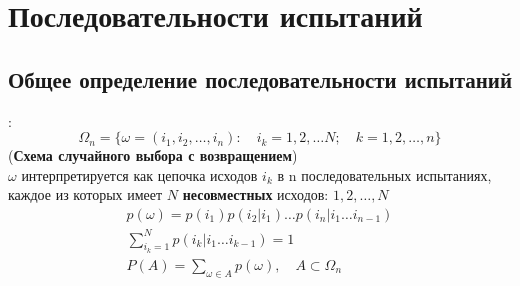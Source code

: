 \section{Последовательности испытаний}

\subsection{Общее определение последовательности испытаний}
:
\begin{equation*}
    \Omega_n = \{\omega = (i_1, i_2, \ldots, i_n)\colon \quad i_k = 1, 2, \ldots N; \quad k = 1, 2, \ldots, n\}
\end{equation*}
(\textbf{Схема случайного выбора с возвращением})\\
$\omega$ интерпретируется как цепочка исходов $i_k$ в n последовательных испытаниях, каждое из которых имеет
$N$ \textbf{несовместных} исходов: $1, 2, \ldots, N$
\begin{gather*}
    p(\omega) = p(i_1) p(i_2|i_1) \ldots p(i_n|i_1 \ldots i_{n-1})\\
    \sum_{i_k=1}^N p(i_k|i_1 \ldots i_{k-1}) = 1\\
    P(A) = \sum_{\omega \in A} p(\omega), \quad A \subset \Omega_n
\end{gather*}

